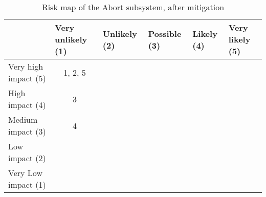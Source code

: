 \begin{table}[H]
\centering
\caption{Risk map of the Abort subsystem, after mitigation}
\label{tab:risk-map-abort-mitig}\begin{tabular}{l|c|c|c|c|c|}
\cline{2-6}
& \multicolumn{1}{l|}{Very unlikely (1)} & \multicolumn{1}{l|}{Unlikely (2)} & \multicolumn{1}{l|}{Possible (3)} & \multicolumn{1}{l|}{Likely (4)} & \multicolumn{1}{l|}{Very likely (5)} \\ \hline
\multicolumn{1}{|l|}{Very high impact (5)} & \cellcolor{rm-3}1, 2, 5 & \cellcolor{rm-3} & \cellcolor{rm-3} & \cellcolor{rm-3} & \cellcolor{rm-3}\\ \hline 
\multicolumn{1}{|l|}{High impact (4)} & \cellcolor{rm-2}3 & \cellcolor{rm-2} & \cellcolor{rm-2} & \cellcolor{rm-3} & \cellcolor{rm-3}\\ \hline 
\multicolumn{1}{|l|}{Medium impact (3)} & \cellcolor{rm-0}4 & \cellcolor{rm-1} & \cellcolor{rm-1} & \cellcolor{rm-2} & \cellcolor{rm-3}\\ \hline 
\multicolumn{1}{|l|}{Low impact (2)} & \cellcolor{rm-0} & \cellcolor{rm-0} & \cellcolor{rm-1} & \cellcolor{rm-2} & \cellcolor{rm-3}\\ \hline 
\multicolumn{1}{|l|}{Very Low impact (1)} & \cellcolor{rm-0} & \cellcolor{rm-0} & \cellcolor{rm-0} & \cellcolor{rm-2} & \cellcolor{rm-3}\\ \hline 
\end{tabular} 
\end{table}

